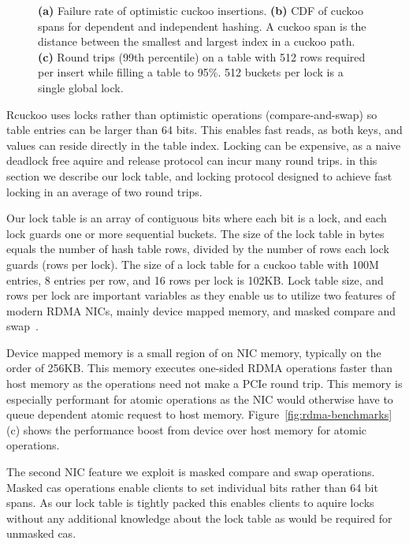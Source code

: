 \begin{figure}[t]
\begin{subfigure}{0.3\linewidth}
    \end{subfigure}
    \vspace{-1em}
    \caption{
    \textbf{(a)} Failure rate of optimistic cuckoo insertions.
    \textbf{(b)} CDF of cuckoo spans for dependent and independent hashing. A cuckoo span is the distance between the smallest and largest index in a cuckoo path.
    \textbf{(c)} Round trips (99th percentile) on a table
    with 512 rows required per insert while filling a table
    to 95\%. 512 buckets per lock is a single global lock.}

    \label{fig:cuckoo-problems}

\end{figure}

Rcuckoo uses locks rather than optimistic operations
(compare-and-swap) so table entries can be larger than 64
bits. This enables fast reads, as both keys, and values can
reside directly in the table index. Locking can be
expensive, as a naive deadlock free aquire and release
protocol can incur many round trips.  in this section we
describe our lock table, and locking protocol designed to
achieve fast locking in an average of two round trips.

Our lock table is an array of contiguous bits where each bit
is a lock, and each lock guards one or more sequential
buckets. The size of the lock table in bytes equals the
number of hash table rows, divided by the number of rows
each lock guards (rows per lock). The size of a lock table
for a cuckoo table with 100M entries, 8 entries per row, and
16 rows per lock is 102KB.  Lock table size, and rows per
lock are important variables as they enable us to utilize
two features of modern RDMA NICs, mainly device mapped
memory, and masked compare and
swap~\cite{rdma-masked-cas,sherman}.

Device mapped memory is a small region of on NIC memory,
typically on the order of 256KB. This memory executes
one-sided RDMA operations faster than host memory as the
operations need not make a PCIe round trip. This memory is
especially performant for atomic operations as the NIC would
otherwise have to queue dependent atomic request to host
memory. Figure~\ref{fig:rdma-benchmarks}(c) shows the
performance boost from device over host memory for atomic
operations.

The second NIC feature we exploit is masked compare and swap
operations. Masked cas operations enable clients to set
individual bits rather than 64 bit spans. As our lock table
is tightly packed this enables clients to aquire locks
without any additional knowledge about the lock table as
would be required for unmasked cas.

